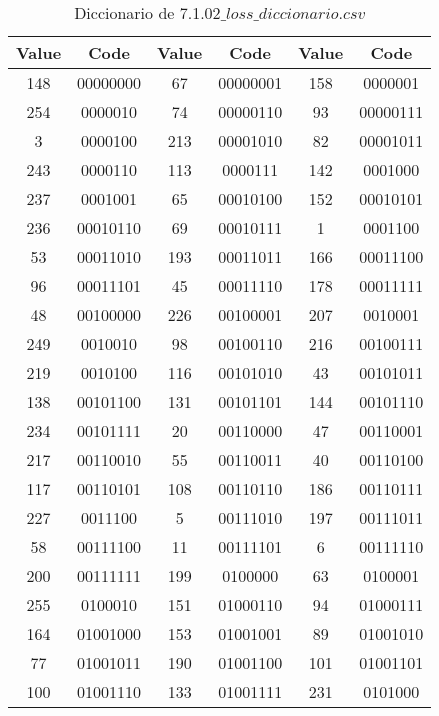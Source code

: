 \documentclass[conference,onecolumn,12pt]{IEEEtran}
\numberwithin{equation}{subsection}
\begin{document}
\begin{table}[h]
\centering
\caption{Diccionario de 7.1.02$\_loss\_diccionario.csv$}
\label{tab:loss_dict_compact}
\begin{tabular}{cccccc}
\hline
\textbf{Value} & \textbf{Code} & \textbf{Value} & \textbf{Code} & \textbf{Value} & \textbf{Code} \\ \hline
148 & 00000000 & 67 & 00000001 & 158 & 0000001 \\ \hline
254 & 0000010 & 74 & 00000110 & 93 & 00000111 \\ \hline
3 & 0000100 & 213 & 00001010 & 82 & 00001011 \\ \hline
243 & 0000110 & 113 & 0000111 & 142 & 0001000 \\ \hline
237 & 0001001 & 65 & 00010100 & 152 & 00010101 \\ \hline
236 & 00010110 & 69 & 00010111 & 1 & 0001100 \\ \hline
53 & 00011010 & 193 & 00011011 & 166 & 00011100 \\ \hline
96 & 00011101 & 45 & 00011110 & 178 & 00011111 \\ \hline
48 & 00100000 & 226 & 00100001 & 207 & 0010001 \\ \hline
249 & 0010010 & 98 & 00100110 & 216 & 00100111 \\ \hline
219 & 0010100 & 116 & 00101010 & 43 & 00101011 \\ \hline
138 & 00101100 & 131 & 00101101 & 144 & 00101110 \\ \hline
234 & 00101111 & 20 & 00110000 & 47 & 00110001 \\ \hline
217 & 00110010 & 55 & 00110011 & 40 & 00110100 \\ \hline
117 & 00110101 & 108 & 00110110 & 186 & 00110111 \\ \hline
227 & 0011100 & 5 & 00111010 & 197 & 00111011 \\ \hline
58 & 00111100 & 11 & 00111101 & 6 & 00111110 \\ \hline
200 & 00111111 & 199 & 0100000 & 63 & 0100001 \\ \hline
255 & 0100010 & 151 & 01000110 & 94 & 01000111 \\ \hline
164 & 01001000 & 153 & 01001001 & 89 & 01001010 \\ \hline
77 & 01001011 & 190 & 01001100 & 101 & 01001101 \\ \hline
100 & 01001110 & 133 & 01001111 & 231 & 0101000 \\ \hline

\end{tabular}
\end{table}
\end{document}
